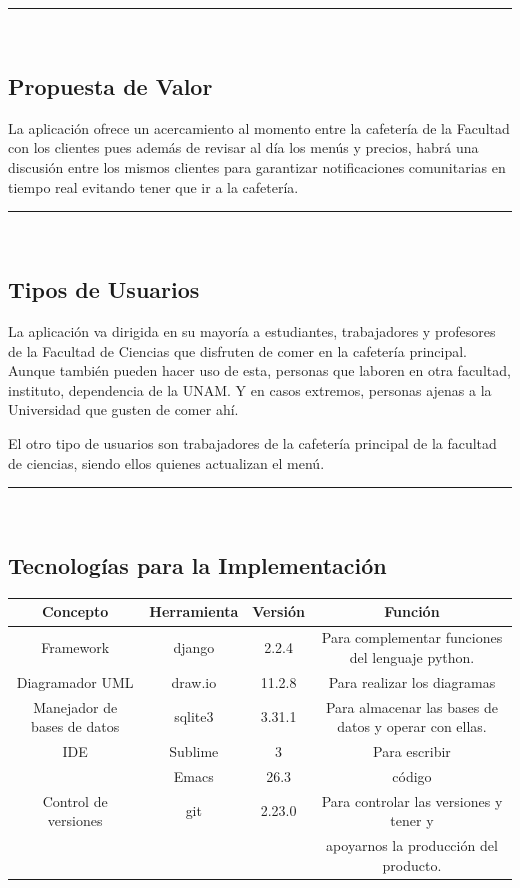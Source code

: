 \documentclass{article}
\begin{document}
\rule{0.8\textwidth}{.8pt}\\

\subsection*{Propuesta de Valor}

La aplicación ofrece un acercamiento al momento entre la cafetería de la
Facultad con los clientes pues además de revisar al día los menús y precios,
habrá una discusión entre los mismos clientes para garantizar notificaciones
comunitarias en tiempo real evitando tener que ir a la cafetería.

\rule{0.8\textwidth}{.8pt}\\

\subsection*{Tipos de Usuarios}

La aplicación va dirigida en su mayoría a estudiantes, trabajadores y profesores
de la Facultad de Ciencias que disfruten de comer en la cafetería principal.
Aunque también pueden hacer uso de esta, personas que laboren en otra facultad,
instituto, dependencia de la UNAM. Y en casos extremos, personas ajenas a la
Universidad que gusten de comer ahí. 

El otro tipo de usuarios son trabajadores de la cafetería principal de la
facultad de ciencias, siendo ellos quienes actualizan el menú.

\rule{0.8\textwidth}{.8pt}\\

\subsection*{Tecnologías para la Implementación}

\begin{center}
  \begin{tabular}{| c | c | c | c | } \hline
    Concepto & Herramienta & Versión & Función \\\hline
    Framework & django & 2.2.4 & Para complementar funciones del lenguaje python. \\\hline
    Diagramador UML & draw.io & 11.2.8 &  Para realizar los diagramas \\\hline
    Manejador de bases de datos & sqlite3 & 3.31.1 & Para almacenar las bases de
    datos y operar con ellas. \\\hline
    IDE & Sublime & 3 & Para escribir \\
    & Emacs & 26.3 & código \\\hline
    Control de versiones & git & 2.23.0 & Para controlar las versiones y tener y \\
    & & & apoyarnos la producción del producto. \\ \hline
  \end{tabular}
\end{center}
\end{document}
